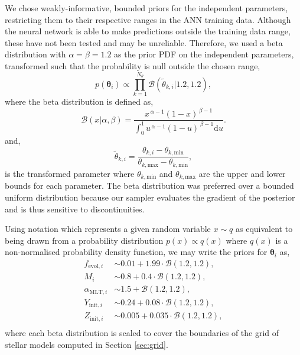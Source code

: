 \documentclass[fleqn,usenatbib]{mnras}
\begin{document}
We chose weakly-informative, bounded priors for the independent parameters, restricting them to their respective ranges in the ANN training data. Although the neural network is able to make predictions outside the training data range, these have not been tested and may be unreliable. Therefore, we used a beta distribution with $\alpha = \beta = 1.2$ as the prior PDF on the independent parameters, transformed such that the probability is null outside the chosen range,
%
\begin{equation}
    p(\boldsymbol{\theta}_i) \propto \prod_{k=1}^{N_{\theta}} \mathcal{B}\left(\tilde{\theta}_{k, i} | 1.2, 1.2\right),
\end{equation}
%
where the beta distribution is defined as,
%
\begin{equation}
    \mathcal{B}(x | \alpha, \beta) = \frac{x^{\,\alpha-1}(1-x)^{\,\beta-1}}{\int_{0}^{1} u^{\,\alpha-1}(1-u)^{\,\beta-1} \mathrm{d} u}.
\end{equation}
%
and,
\begin{equation}
    \tilde{\theta}_{k, i} = \frac{\theta_{k, i} - \theta_{k, \mathrm{min}}}{\theta_{k, \mathrm{max}} - \theta_{k, \mathrm{min}}},
\end{equation}
is the transformed parameter where $\theta_{k, \mathrm{min}}$ and $\theta_{k, \mathrm{max}}$ are the upper and lower bounds for each parameter. The beta distribution was preferred over a bounded uniform distribution because our sampler evaluates the gradient of the posterior and is thus sensitive to discontinuities. 

Using notation which represents a given random variable $x \sim q$ as equivalent to being drawn from a probability distribution $p(x) \propto q(x)$ where $q(x)$ is a non-normalised probability density function, we may write the priors for $\boldsymbol{\theta}_i$ as,
%
\begin{align*}
    f_{\mathrm{evol}, i} &\sim 0.01 + 1.99 \cdot \mathcal{B}(1.2, 1.2),\\
    M_i &\sim 0.8 + 0.4 \cdot \mathcal{B}(1.2, 1.2),\\
    \alpha_{\mathrm{MLT}, i} &\sim 1.5 + \mathcal{B}(1.2, 1.2),\\
    Y_{\mathrm{init}, i} &\sim 0.24 + 0.08 \cdot \mathcal{B}(1.2, 1.2),\\
    Z_{\mathrm{init}, i} &\sim 0.005 + 0.035 \cdot \mathcal{B}(1.2, 1.2),\\
\end{align*}
%
where each beta distribution is scaled to cover the boundaries of the grid of stellar models computed in Section \ref{sec:grid}.
\end{document}
